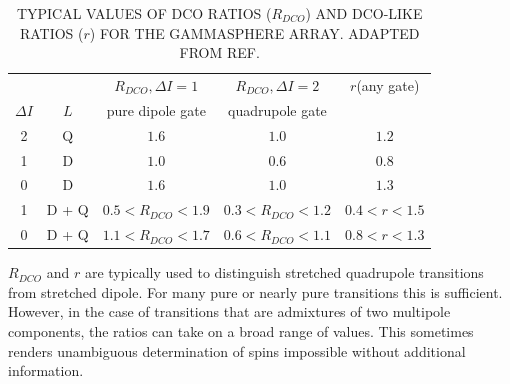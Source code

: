 \begin{table}[t]
\caption[TYPICAL VALUES OF DCO RATIOS AND DCO-LIKE RATIOS FOR THE GAMMASPHERE ARRAY.]{TYPICAL VALUES OF DCO RATIOS ($R_{DCO}$) AND DCO-LIKE RATIOS ($r$) FOR THE GAMMASPHERE ARRAY. ADAPTED FROM REF. \cite{dcoLike}\label{tbl:chp3-dco-ratios}}
\centering
\begin{tabular}{ccccc}
\toprule
& & $R_{DCO}, \Delta{}I=1$ & $R_{DCO}, \Delta{}I=2$ & $r$(any gate)\\
$\Delta I$ & $L$ & pure dipole gate & quadrupole gate & \\
\midrule
2 & Q     & $1.6$             & $1.0$             & $1.2$\\
1 & D     & $1.0$             & $0.6$             & $0.8$\\
0 & D     & $1.6$             & $1.0$             & $1.3$\\
1 & D + Q & $0.5<R_{DCO}<1.9$ & $0.3<R_{DCO}<1.2$ & $0.4<r<1.5$\\
0 & D + Q & $1.1<R_{DCO}<1.7$ & $0.6<R_{DCO}<1.1$ & $0.8<r<1.3$\\
\bottomrule
\end{tabular}
\end{table}

$R_{DCO}$ and $r$ are typically used to distinguish stretched quadrupole transitions from stretched dipole. For many pure or nearly pure transitions this is sufficient. However, in the case of transitions that are admixtures of two multipole components, the ratios can take on a broad range of values. This sometimes renders unambiguous determination of spins impossible without additional information.

